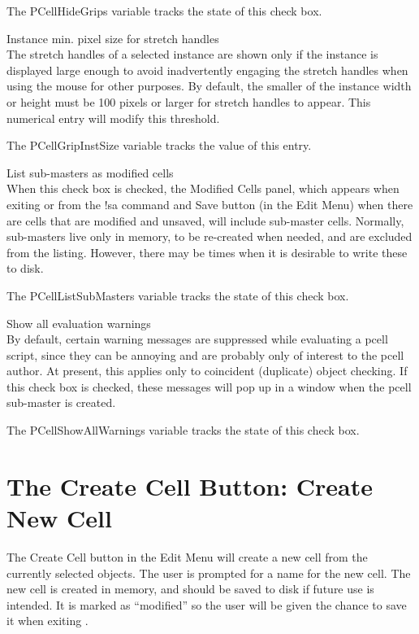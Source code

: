 \begin{description}
The {\et PCellHideGrips} variable tracks the state of this check box.

\item{\cb Instance min. pixel size for stretch handles}\\
The stretch handles of a selected instance are shown only if the
instance is displayed large enough to avoid inadvertently engaging the
stretch handles when using the mouse for other purposes.  By default,
the smaller of the instance width or height must be 100 pixels or
larger for stretch handles to appear.  This numerical entry will
modify this threshold.

The {\et PCellGripInstSize} variable tracks the value of this entry.

\item{\cb List sub-masters as modified cells}\\
When this check box is checked, the {\cb Modified Cells} panel, which
appears when exiting {\Xic} or from the {\cb !sa} command and {\cb
Save} button (in the {\cb Edit Menu}) when there are cells that are
modified and unsaved, will include sub-master cells.  Normally,
sub-masters live only in memory, to be re-created when needed, and are
excluded from the listing.  However, there may be times when it is
desirable to write these to disk.

The {\et PCellListSubMasters} variable tracks the state of this check
box.

\item{\cb Show all evaluation warnings}\\
By default, certain warning messages are suppressed while
evaluating a pcell script, since they can be annoying and are
probably only of interest to the pcell author.  At present, this
applies only to coincident (duplicate) object checking.  If this
check box is checked, these messages will pop up in a window when
the pcell sub-master is created.

The {\et PCellShowAllWarnings} variable tracks the state of this check
box.
\end{description}


\section{The {\cb Create Cell} Button: Create New Cell}
The {\cb Create Cell} button in the {\cb Edit Menu} will create a new
cell from the currently selected objects.  The user is prompted for a
name for the new cell.  The new cell is created in memory, and should
be saved to disk if future use is intended.  It is marked as
``modified'' so the user will be given the chance to save it when
exiting {\Xic}.

